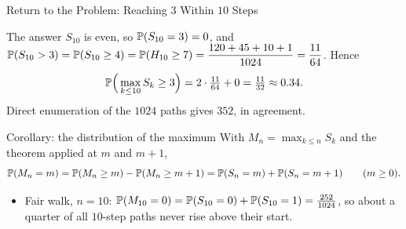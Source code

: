 \begin{frame}{Return to the Problem: Reaching $3$ Within $10$ Steps}
  \label{fr:reflectreturn}
  \small
  \begin{exampleblock}{The answer}
    $S_{10}$ is even, so $\mathbb{P}(S_{10}=3)=0$, and $\mathbb{P}(S_{10}>3)=\mathbb{P}(S_{10}\ge4)=\mathbb{P}(H_{10}\ge7)=\dfrac{120+45+10+1}{1024}=\dfrac{11}{64}$. Hence
    \[
      \mathbb{P}\Big(\max_{k\le10}S_k\ge3\Big)=2\cdot\tfrac{11}{64}+0=\tfrac{11}{32}\approx0.34 .
    \]
    Direct enumeration of the $1024$ paths gives $352$, in agreement.
  \end{exampleblock}
  \begin{block}{Corollary: the distribution of the maximum}
    With $M_n=\max_{k\le n}S_k$ and the theorem applied at $m$ and $m+1$,
    \[
      \mathbb{P}(M_n=m)=\mathbb{P}(M_n\ge m)-\mathbb{P}(M_n\ge m+1)=\mathbb{P}(S_n=m)+\mathbb{P}(S_n=m+1)\qquad(m\ge0).
    \]
  \end{block}
  \begin{itemize}
    \item Fair walk, $n=10$: $\mathbb{P}(M_{10}=0)=\mathbb{P}(S_{10}=0)+\mathbb{P}(S_{10}=1)=\tfrac{252}{1024}$, so about a quarter of all $10$-step paths never rise above their start.
  \end{itemize}
\end{frame}

